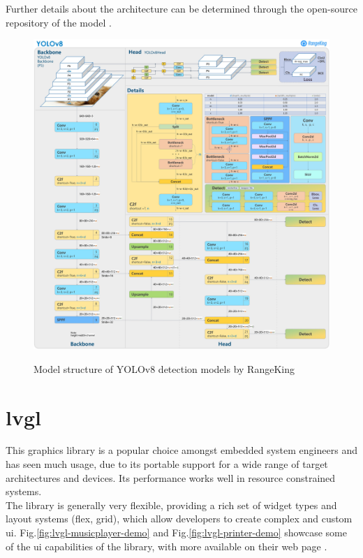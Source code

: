 \documentclass[Bachelor, BIC, english, fhCitStyle, IEEE]{BASE/twbook} %
\newcommand{\nocontentsline}[3]{}
\newcommand{\hidsection}[1]{\bgroup\let\addcontentsline=\nocontentsline\section{#1}\egroup}
\begin{document}
Further details about the architecture can be determined through the open-source repository of the model \autocite{jocherUltralyticsYOLO2023}.
\begin{figure}
    \caption{Model structure of YOLOv8 detection models by RangeKing \autocite{BriefSummaryYOLOv8}}
    \centering
    \includegraphics[width=\textwidth]{yolov8_model_architecture.jpg}
    \label{fig:yolov8-model-architecture}
\end{figure}
\clearpage
\hidsection{\acf{lvgl}}
\noindent
This graphics library \autocite{LVGLLightVersatile} is a popular choice amongst embedded system engineers and has seen much usage, due to its portable support for a wide range of target architectures and devices. Its performance works well in resource constrained systems.\\
The library is generally very flexible, providing a rich set of widget types \autocite{WidgetsLVGLDocumentation} and layout systems (flex, grid), which allow developers to create complex and custom \ac{ui}. Fig.\ref{fig:lvgl-musicplayer-demo} and Fig.\ref{fig:lvgl-printer-demo} showcase some of the \ac{ui} capabilities of the library, with more available on their web page \autocite{llcLiveDemosTest}.
\end{document}

